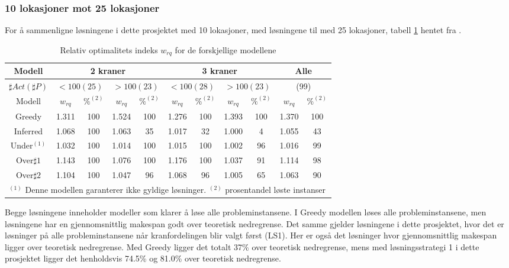 \subsubsection{10 lokasjoner mot 25 lokasjoner}
For å sammenligne løsningene i dette prosjektet med 10 lokasjoner, med løsningene til \bht med 25 lokasjoner, tabell \ref{tab:resultaterSumTvedt} hentet fra \cite{tvedtbezem}.
\begin{table}[!h]
\caption{Relativ optimalitets indeks $w_{rq}$ for de forskjellige modellene}
\begin{center}
\begin{tabular}{ | c | c | c | c | c | c | c | c | c | c | c | }
\hline
\textbf{Modell} & \multicolumn{4}{|c|}{\textbf{2 kraner}} & \multicolumn{4}{|c|}{\textbf{3 kraner}} & \multicolumn{2}{|c|}{\textbf{Alle}} \\ \hline
$\sharp Act(\sharp P)$ & \multicolumn{2}{|c|}{$< 100 (25)$} & \multicolumn{2}{|c|}{$> 100 (23)$} & \multicolumn{2}{|c|}{$< 100 (28)$} & \multicolumn{2}{|c|}{$> 100 (23)$} & \multicolumn{2}{|c|}{(99)} \\ 
\hline
Modell & $w_{rq}$ & $\%^{(2)}$ & $w_{rq}$ & $\%^{(2)}$  & $w_{rq}$ & $\%^{(2)}$ & $w_{rq}$ & $\%^{(2)}$ & $w_{rq}$ & $\%^{(2)}$ \\ \hline
Greedy & 1.311 & 100 & 1.524 & 100 & 1.276 & 100 & 1.393 & 100 & 1.370 & 100 \\
Inferred & 1.068 & 100 & 1.063 & 35 & 1.017 & 32 & 1.000 & 4 & 1.055 & 43 \\
Under$^{(1)}$ & 1.032 & 100 & 1.014 & 100 & 1.015 & 100 & 1.002 & 96 & 1.016 & 99 \\
Over$\sharp 1$ & 1.143 & 100 & 1.076 & 100 & 1.176 & 100 & 1.037 & 91 & 1.114 & 98 \\
Over$\sharp 2$ & 1.104 & 100 & 1.047 & 96 & 1.068 & 96 & 1.005 & 65 & 1.063 & 90 \\
\hline
\multicolumn{11}{l}{\begin{minipage}{6in}$^{(1)}$ Denne modellen garanterer ikke gyldige løsninger.
$^{(2)}$ prosentandel løste instanser \end{minipage}}
\end{tabular}
\end{center}
\label{tab:resultaterSumTvedt}
\end{table}
Begge løsningene inneholder modeller som klarer å løse alle probleminstansene. I Greedy modellen løses alle probleminstansene, men løsningene har en gjennomsnittlig makespan godt over teoretisk nedregrense. Det samme gjelder løsningene i dette prosjektet, hvor det er løsninger på alle probleminstansene når kranfordelingen blir valgt først (LS1). Her er også det løsninger hvor gjennomsnittlig makespan ligger over teoretisk nedregrense. Med Greedy ligger det totalt 37\% over teoretisk nedregrense, mens med løsningsstrategi 1 i dette prosjektet ligger det henholdsvis 74.5\% og 81.0\% over teoretisk nedregrense.

